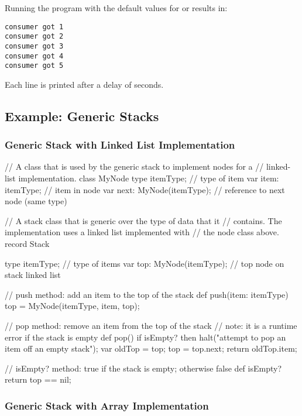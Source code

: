 Running the program with the default 
values for  or  results in: 
\begin{verbatim}
consumer got 1
consumer got 2
consumer got 3
consumer got 4
consumer got 5
\end{verbatim}
Each line is printed after a delay of  seconds.


\subsection{Example: Generic Stacks}

\subsubsection{Generic Stack with Linked List Implementation}

\begin{numberedchapel}
// A class that is used by the generic stack to implement nodes for a
// linked-list implementation.
class MyNode {
  type itemType;              // type of item
  var item: itemType;         // item in node
  var next: MyNode(itemType); // reference to next node (same type)
}

// A stack class that is generic over the type of data that it
// contains.  The implementation uses a linked list implemented with
// the node class above.
record Stack {
  type itemType;             // type of items
  var top: MyNode(itemType); // top node on stack linked list

  // push method: add an item to the top of the stack
  def push(item: itemType) {
    top = MyNode(itemType, item, top);
  }

  // pop method: remove an item from the top of the stack
  // note: it is a runtime error if the stack is empty
  def pop() {
    if isEmpty? then
      halt("attempt to pop an item off an empty stack");
    var oldTop = top;
    top = top.next;
    return oldTop.item;
  }

  // isEmpty? method: true if the stack is empty; otherwise false
  def isEmpty? return top == nil;
}
\end{numberedchapel}

\subsubsection{Generic Stack with Array Implementation}

